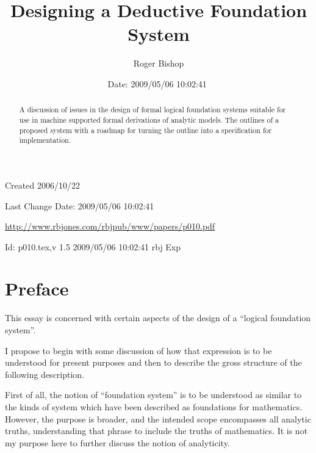 \documentclass[numreferences]{rbjk}
\begin{document}
                                                                                   
\begin{article}
\begin{opening}  
\title{Designing a Deductive Foundation System}
\author{Roger Bishop }
\date{$ $Date: 2009/05/06 10:02:41 $ $}

\begin{abstract}
A discussion of issues in the design of formal logical foundation systems suitable for use in machine supported formal derivations of analytic models.
The outlines of a proposed system with a roadmap for turning the outline into a specification for implementation. 
\end{abstract}
\end{opening}

\vfill

\begin{centering}
\footnotesize{
Created 2006/10/22

Last Change $ $Date: 2009/05/06 10:02:41 $ $

\href{http://www.rbjones.com/rbjpub/www/papers/p010.pdf}{http://www.rbjones.com/rbjpub/www/papers/p010.pdf}

$ $Id: p010.tex,v 1.5 2009/05/06 10:02:41 rbj Exp $ $\\

}%
\end{centering}

\newpage
\setcounter{tocdepth}{4}
{\parskip-0pt\tableofcontents}

\section{Preface}

This essay is concerned with certain aspects of the design of a ``logical foundation system''.

I propose to begin with some discussion of how that expression is to be understood for present purposes and then to describe the gross structure of the following description.

First of all, the notion of ``foundation system'' is to be understood as similar to the kinds of system which have been described as foundations for mathematics.
However, the purpose is broader, and the intended scope encompasses all analytic truths, understanding that phrase to include the truths of mathematics.
It is not my purpose here to further discuss the notion of analyticity.


\end{article}
\end{document}
